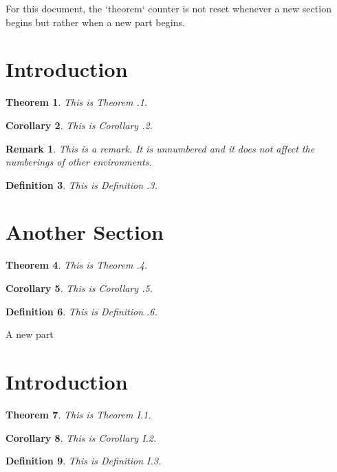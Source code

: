 \documentclass{article}
\newtheorem{theorem}{Theorem}
\newtheorem{corollary}[theorem]{Corollary}
\newtheorem{definition}[theorem]{Definition}
\newtheorem*{remark*}{Remark}
\numberwithin{theorem}{part}
\begin{document}
For this document, the `theorem` counter is not reset whenever a new section begins but rather when a new part begins.

\section{Introduction}

\begin{theorem}
This is Theorem .1.
\end{theorem}

\begin{corollary}
This is Corollary .2.
\end{corollary}

\begin{remark*}
This is a remark. It is unnumbered and it does not affect the numberings of other environments.
\end{remark*}

\begin{definition}
This is Definition .3.
\end{definition}

\section{Another Section}

\begin{theorem}
This is Theorem .4.
\end{theorem}

\begin{corollary}
This is Corollary .5.
\end{corollary}

\begin{definition}
This is Definition .6.
\end{definition}

\begin{part}{A new part}
\section{Introduction}

\begin{theorem}
This is Theorem I.1.
\end{theorem}

\begin{corollary}
This is Corollary I.2.
\end{corollary}

\begin{definition}
This is Definition I.3.
\end{definition}

\end{part}
\end{document}
